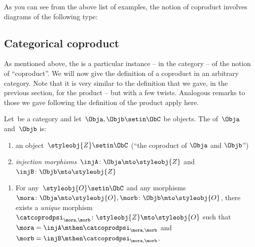 
As you can see from the above list of examples, the notion of coproduct involves diagrams of the following type:
%

\subsection{Categorical coproduct}

As mentioned above, the  is a particular instance -- in the category \Set -- of the notion of ``coproduct''.
We will now give the definition of a coproduct in an arbitrary category.
Note that it is very similar to the definition that we gave, in the previous section, for the product -- but with a few twists.
Analogous remarks to those we gave following the definition of the product apply here.

\begin{ctdefinition}
    \label{def:categorical-coproduct}
    Let~\CatC be a category and let~$\Obja, \Objb \setin \ObC$ be objects.
    The  of~$\Obja$ and~$\Objb$ is: \\
    \constit
    \begin{enumerate}
        \item an object~$\styleobj{Z} \setin \ObC$ (``the coproduct of $\Obja$ and $\Objb$'')
        \item \emph{injection morphisms}~$\injA \colon \Obja \mto \styleobj{Z} $ and~$\injB \colon \Objb \mto \styleobj{Z} $
    \end{enumerate}
    \condit
    \begin{enumerate}
        \item For any~$\styleobj{O} \setin \ObC$ and any morphisms~$\mora \colon \Obja \mto \styleobj{O}, \morb \colon \Objb \mto \styleobj{O}$, there exists a \emph{unique} morphism~$\catcoprodpsi_{\mora, \morb} \colon \styleobj{Z} \mto \styleobj{O}$ such that~$\mora = \injA\mthen \catcoprodpsi_{\mora, \morb}$ and~$\morb = \injB \mthen \catcoprodpsi_{\mora,\morb}$.
    \end{enumerate}
\end{ctdefinition}


